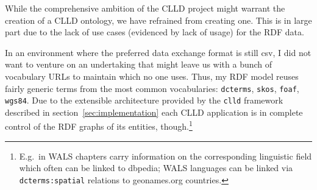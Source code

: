 \documentclass[a4paper,10pt]{article}
\begin{document}
\label{sec:vocab}

While the comprehensive ambition of the CLLD project might warrant the creation of a CLLD ontology, we have refrained from creating one. This is in large part due to the lack of use cases (evidenced by lack of usage) for the RDF data.

In an environment where the preferred data exchange format is still csv, I did not want to venture on an undertaking that might leave us with a bunch of vocabulary URLs to maintain which no one uses.
Thus, my RDF model reuses fairly generic terms from the most common vocabularies: \texttt{dcterms}, \texttt{skos}, \texttt{foaf}, \texttt{wgs84}.
Due to the extensible architecture provided by the \texttt{clld} framework described in section~\ref{sec:implementation} 
each CLLD application is in complete control of the RDF graphs of its entities, though.\footnote{E.g.~in WALS chapters carry information on the corresponding linguistic field which often can be linked to dbpedia; WALS languages can be linked via \texttt{dcterms:spatial} relations to geonames.org countries.}








\end{document}

